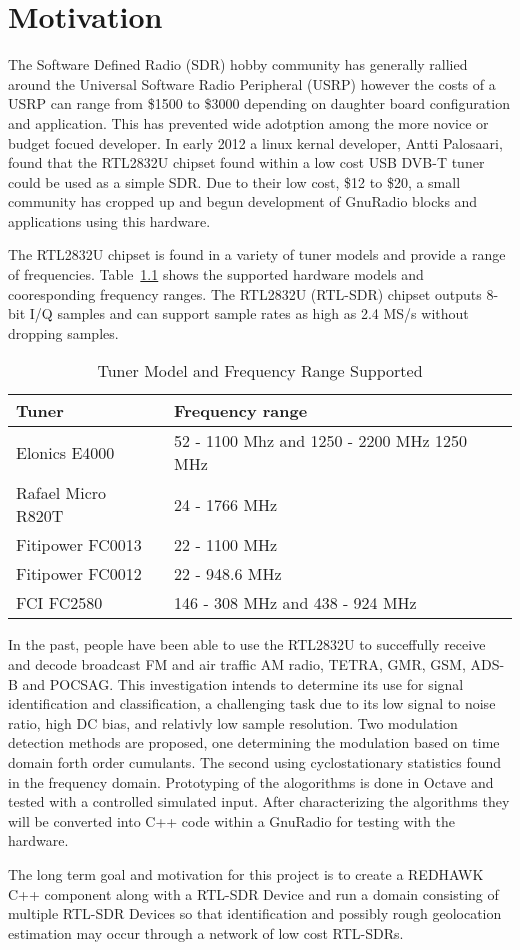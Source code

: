 \chapter{Motivation}

The Software Defined Radio (SDR) hobby community has generally rallied around
the Universal Software Radio Peripheral (USRP) however the costs of a USRP can
range from \$1500 to \$3000 depending on daughter board configuration and
application.  This has prevented wide adotption among the more novice or budget
focued developer. In early 2012 a linux kernal developer, Antti Palosaari, found
that the RTL2832U chipset found within a low cost USB DVB-T tuner
could be used as a simple SDR.  Due to their low cost, \$12 to \$20, a
small community has cropped up and begun development of GnuRadio blocks and
applications using this hardware.

The RTL2832U chipset is found in a variety of tuner models and provide a range of frequencies.
Table~\ref{tab:ModelAndFreq} shows the supported hardware models and
cooresponding frequency ranges.  The RTL2832U (RTL-SDR) chipset outputs 8-bit
I/Q samples and can support sample rates as high as 2.4 MS/s without dropping samples.  

\begin{table}
\caption{Tuner Model and Frequency Range Supported}
\begin{tabular}{| l | l |} \hline
Tuner	& Frequency range \\ \hline
Elonics E4000	& 52 - 1100 Mhz and 1250 - 2200 MHz 1250 MHz \\ \hline
Rafael Micro R820T &	24 - 1766 MHz \\ \hline
Fitipower FC0013 & 22 - 1100 MHz  \\ \hline
Fitipower FC0012 &	22 - 948.6 MHz \\ \hline
FCI FC2580	& 146 - 308 MHz and 438 - 924 MHz \\ \hline
\end{tabular}
\label{tab:ModelAndFreq}
\end{table}

In the past, people have been able to use the RTL2832U to succeffully
receive and decode broadcast FM and air traffic AM radio, TETRA, GMR, GSM, ADS-B
and POCSAG.  This investigation intends to determine its use for signal
identification and classification, a challenging task due to its low signal to
noise ratio, high DC bias, and relativly low sample resolution.  Two
modulation detection methods are proposed, one determining the modulation
based on time domain forth order cumulants.  The second using cyclostationary
statistics found in the frequency domain.  Prototyping of the alogorithms
is done in Octave and tested with a controlled simulated input. 
After characterizing the algorithms they will be converted into C++ code
within a GnuRadio for testing with the hardware. 

The long term goal and motivation for this project is to create a REDHAWK C++
component along with a RTL-SDR Device and run a domain consisting of multiple
RTL-SDR Devices so that identification and possibly rough geolocation 
estimation may occur through a network of low cost RTL-SDRs.


